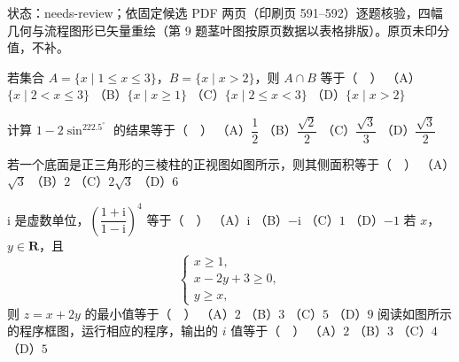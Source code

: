 状态：needs-review；依固定候选 PDF 两页（印刷页 591–592）逐题核验，四幅几何与流程图形已矢量重绘（第 9 题茎叶图按原页数据以表格排版）。原页未印分值，不补。
\begin{question}
若集合 $A=\{x\mid1\leqslant x\leqslant3\}$，$B=\{x\mid x>2\}$，则 $A\cap B$ 等于（　）
（A）$\{x\mid2<x\leqslant3\}$
（B）$\{x\mid x\geqslant1\}$
（C）$\{x\mid2\leqslant x<3\}$
（D）$\{x\mid x>2\}$
\end{question}
\begin{question}
计算 $1-2\sin^222.5^\circ$ 的结果等于（　）
（A）$\dfrac12$
（B）$\dfrac{\sqrt2}{2}$
（C）$\dfrac{\sqrt3}{3}$
（D）$\dfrac{\sqrt3}{2}$
\Needspace{0.4\textheight}
\end{question}
\begingroup
\renewenvironment{question}{\Needspace{0.5\textheight}}{}
\begin{question}
若一个底面是正三角形的三棱柱的正视图如图所示，则其侧面积等于（　）
（A）$\sqrt3$
（B）$2$
（C）$2\sqrt3$
（D）$6$
\nopagebreak[4]
\begin{center}\end{center}
\nopagebreak[4]
\end{question}
\endgroup
\begin{question}
$\mathrm{i}$ 是虚数单位，$\left(\dfrac{1+\mathrm{i}}{1-\mathrm{i}}\right)^4$ 等于（　）
（A）$\mathrm{i}$
（B）$-\mathrm{i}$
（C）$1$
（D）$-1$
\end{question}
\begin{question}
若 $x$，$y\in\mathbf R$，且
\nopagebreak[4]
\[\begin{cases}x\geqslant1,\\x-2y+3\geqslant0,\\y\geqslant x,\end{cases}\]
则 $z=x+2y$ 的最小值等于（　）
（A）$2$
（B）$3$
（C）$5$
（D）$9$
\Needspace{0.4\textheight}
\end{question}
\begingroup
\renewenvironment{question}{\Needspace{0.5\textheight}}{}
\begin{question}
阅读如图所示的程序框图，运行相应的程序，输出的 $i$ 值等于（　）
（A）$2$
（B）$3$
（C）$4$
（D）$5$
\nopagebreak[4]
\begin{center}\end{center}
\nopagebreak[4]
\end{question}
